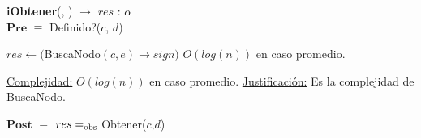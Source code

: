 \begin{algorithm}[H]{\textbf{iObtener}(, ) $\to$ $res$ : $\alpha$}
	{\\ $\textbf{Pre}$ $\equiv$ Definido?($c$, $d$)}
	\begin{algorithmic}[1]

		\State $res \gets ($BuscaNodo$(c,e)$$\rightarrow$$sign)$ \Comment $O(log(n))$ en caso promedio.

		\medskip
		\Statex \underline{Complejidad:} $O(log(n))$ en caso promedio.
		\Statex \underline{Justificación:} Es la complejidad de BuscaNodo.

    \end{algorithmic}
    {$\textbf{Post}$ $\equiv$ $res =_{\mathrm{obs}}$ Obtener($c$,$d$)}
\end{algorithm}


